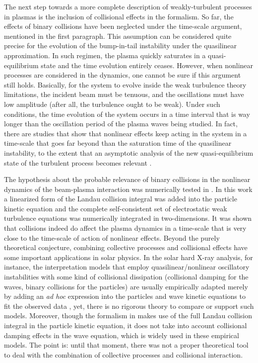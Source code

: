 \documentclass[12pt,a4paper,ruledheader]{report}
\begin{document}
The next step towards a more complete description of weakly-turbulent
processes in plasmas is the inclusion of collisional effects in the
formalism. So far, the effects of binary collisions have been neglected
under the time-scale argument, mentioned in the first paragraph. This
assumption can be considered quite precise for the evolution of the
bump-in-tail instability under the quasilinear approximation. In such
regimen, the plasma quickly saturates in a quasi-equilibrium state and
the time evolution entirely ceases. However, when nonlinear processes
are considered in the dynamics, one cannot be sure if this argument
still holds. Basically, for the system to evolve inside the weak
turbulence theory limitations, the incident beam must be tenuous, and
the oscillations must have low amplitude (after all, the turbulence
ought to be weak). Under such conditions, the time evolution of the
system occurs in a time interval that is way longer than the oscillation
period of the plasma waves being studied. In fact, there are studies that
show that nonlinear effects keep acting in the system in a time-scale that
goes far beyond than the saturation time of the quasilinear instability,
to the extent that an asymptotic analysis of the new quasi-equilibrium
state of the turbulent process becomes relevant \cite{Yoon2012c,ZYGP14a,
  ZYGP14b,ZYSGP14c,ZYPGP15}.

The hypothesis about the probable relevance of binary
collisions in the nonlinear dynamics of the beam-plasma
interaction was numerically tested in \cite{Tigik2016a}.
In this work a linearized form of the Landau collision
integral was added into the particle kinetic equation
and the complete self-consistent set of electrostatic
weak turbulence equations was numerically integrated in
two-dimensions. It was shown that collisions indeed do
affect the plasma dynamics in a time-scale that is very
close to the time-scale of action of nonlinear effects.
Beyond the purely theoretical conjecture, combining
collective processes and collisional effects have some
important applications in solar physics. In the solar
hard X-ray analysis, for instance, the interpretation
models that employ quasilinear/nonlinear oscillatory
instabilities with some kind of collisional dissipation
(collisional damping for the waves, binary collisions for
the particles) are usually empirically adapted merely by
adding an \emph{ad hoc} expression into the particles and wave
kinetic equations to fit the observed data \cite{PK95,
  Kohl1998,Veronig05,Brown2006,Kontar2011,KKDSSK11}, yet,
there is no rigorous theory to compare or support such
models. Moreover, though the formalism in \cite{Tigik2016a}
makes use of the full Landau collision integral in the
particle kinetic equation, it does not take into account
collisional damping effects in the wave equation, which is
widely used in these empirical models. The point is: until
that moment, there was not a proper theoretical tool to deal
with the combination of collective processes and collisional
interaction.
\end{document}
